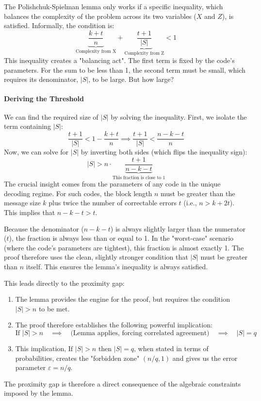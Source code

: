 \documentclass{article}
\begin{document}
\begin{tcolorbox}[breakable, title={The Lemma's Condition and the Origin of the Gap}]
The Polishchuk-Spielman lemma only works if a specific inequality, which balances the complexity of the problem across its two variables ($X$ and $Z$), is satisfied. Informally, the condition is:
\[ \underbrace{\frac{k+t}{n}}_{\text{Complexity from X}} + \underbrace{\frac{t+1}{|S|}}_{\text{Complexity from Z}} < 1 \]
This inequality creates a "balancing act". The first term is fixed by the code's parameters. For the sum to be less than 1, the second term must be small, which requires its denominator, $|S|$, to be large. But how large?

\paragraph{Deriving the Threshold}
We can find the required size of $|S|$ by solving the inequality. First, we isolate the term containing $|S|$:
\[ \frac{t+1}{|S|} < 1 - \frac{k+t}{n} \implies \frac{t+1}{|S|} < \frac{n - k - t}{n} \]
Now, we can solve for $|S|$ by inverting both sides (which flips the inequality sign):
\[ |S| > n \cdot \underbrace{\frac{t+1}{n-k-t}}_{\text{This fraction is close to 1}} \]
The crucial insight comes from the parameters of any code in the unique decoding regime. For such codes, the block length $n$ must be greater than the message size $k$ plus twice the number of correctable errors $t$ (i.e., $n > k+2t$). This implies that $n-k-t > t$.

Because the denominator ($n-k-t$) is always slightly larger than the numerator ($t$), the fraction is always less than or equal to 1. In the "worst-case" scenario (where the code's parameters are tightest), this fraction is almost exactly 1. The proof therefore uses the clean, slightly stronger condition that $|S|$ must be greater than $n$ itself. This ensures the lemma's inequality is always satisfied.

This leads directly to the proximity gap:
\begin{enumerate}
    \item The lemma provides the engine for the proof, but requires the condition $|S| > n$ to be met.
    \item The proof therefore establishes the following powerful implication:
    \[ \text{If } |S| > n \quad \implies \quad \text{(Lemma applies, forcing correlated agreement)} \quad \implies \quad |S| = q \]
    \item This implication, $\text{If } |S|>n \text{ then } |S|=q$, when stated in terms of probabilities, creates the "forbidden zone" $(n/q, 1)$ and gives us the error parameter $\varepsilon = n/q$.
\end{enumerate}
The proximity gap is therefore a direct consequence of the algebraic constraints imposed by the lemma.
\end{tcolorbox}
\end{document}

